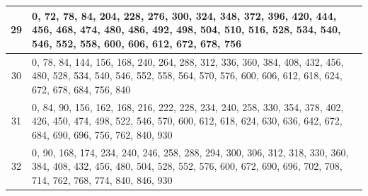 \documentclass[12pt,a4paper]{article}
\begin{document}
\begin{table}[h]
\begin{center}
{\begin{tabular}{|c|p{15cm}|}
					29 & 0, 72, 78, 84, 204, 228, 276, 300, 324, 348, 372, 396, 420, 444, 456, 468, 474, 480, 486, 492, 498, 504, 510, 516, 528, 534, 540, 546, 552, 558, 600, 606, 612, 672, 678, 756 \\ \hline
					30 & 0, 78, 84, 144, 156, 168, 240, 264, 288, 312, 336, 360, 384, 408, 432, 456, 480, 528, 534, 540, 546, 552, 558, 564, 570, 576, 600, 606, 612, 618, 624, 672, 678, 684, 756, 840 \\ \hline
					31 & 0, 84, 90, 156, 162, 168, 216, 222, 228, 234, 240, 258, 330, 354, 378, 402, 426, 450, 474, 498, 522, 546, 570, 600, 612, 618, 624, 630, 636, 642, 672, 684, 690, 696, 756, 762, 840, 930 \\ \hline
					32 & 0, 90, 168, 174, 234, 240, 246, 258, 288, 294, 300, 306, 312, 318, 330, 360, 384, 408, 432, 456, 480, 504, 528, 552, 576, 600, 672, 690, 696, 702, 708, 714, 762, 768, 774, 840, 846, 930 \\ \hline
			\end{tabular}}
		\end{center}
	\end{table}
\end{document}

